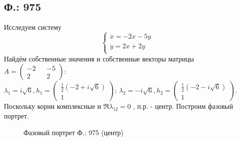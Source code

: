 \documentclass{article}
\begin{document}
\subsection{Ф.: 975}
Исследуем систему 
\begin{equation}
\begin{cases}
        \dot{x}=-2x-5y\\
        \dot{y}=2x+2y\\
    \end{cases}    
\end{equation}
Найдём собственные значения и собственные векторы матрицы $A=\begin{pmatrix}-2 && -5 \\ 2 && 2 \end{pmatrix}$:\\
 $\lambda_1= i\sqrt6,h_1 = \begin{pmatrix} \frac{1}{2} \left(-2+i \sqrt{6}\right)  \\  1 \end{pmatrix} $; $\lambda_2= -i\sqrt6,h_2 = \begin{pmatrix} \frac{1}{2} \left(-2-i \sqrt{6}\right)  \\  1 \end{pmatrix} $. Поскольку корни комплексные и $\Re{\lambda_{12}}=0$ , п.р. - центр. Построим фазовый портрет.
 \begin{figure}[ht]
\caption{Фазовый портрет Ф.: 975 (центр)}
\label{975}
\end{figure}\\
\end{document}
